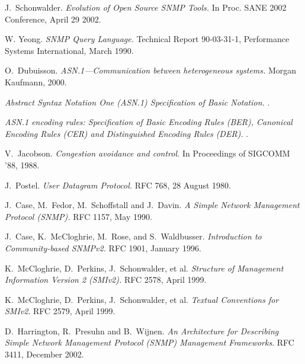 \documentclass[reprint,9pt]{sigplanconf}
\begin{document}
\begin{thebibliography}{10}

J.~Schonwalder.
\newblock \textsl{Evolution of Open Source SNMP Tools.}
\newblock In Proc. SANE 2002 Conference, April 29 2002.

W. Yeong.
\newblock \textsl{SNMP Query Language.}
\newblock Technical Report 90-03-31-1, Performance Systems International, March 1990.

O.~Dubuisson.
\newblock \textsl{ASN.1---Communication between heterogeneous systems.}
\newblock Morgan Kaufmann, 2000.

\textsl{Abstract Syntax Notation One (ASN.1) Specification of Basic
  Notation.}
.

\textsl{ASN.1 encoding rules: Specification of Basic Encoding Rules
  (BER), Canonical Encoding Rules (CER) and Distinguished Encoding Rules
  (DER).}
.

V.~Jacobson.
\newblock \textsl{Congestion avoidance and control.}
\newblock In Proceedings of SIGCOMM '88, 1988.


J.~Postel.
\newblock \textsl{User Datagram Protocol.}
\newblock RFC 768, 28 August 1980.

J.~Case, M.~Fedor, M.~Schoffstall and J.~Davin.
\newblock \textsl{A Simple Network Management Protocol (SNMP).}
\newblock RFC 1157, May 1990.

J.~Case, K.~McCloghrie, M.~Rose, and S.~Waldbusser.
\newblock \textsl{Introduction to Community-based SNMPv2.}
\newblock RFC 1901, January 1996.

K.~McCloghrie, D.~Perkins, J.~Schonwalder, et al.
\newblock \textsl{Structure of Management Information Version 2 (SMIv2).}
\newblock RFC 2578, April 1999.

K.~McCloghrie, D.~Perkins, J.~Schonwalder, et al.
\newblock \textsl{Textual Conventions for SMIv2}.
\newblock RFC 2579, April 1999.

D.~Harrington, R.~Presuhn and B.~Wijnen.
\newblock \textsl{An Architecture for Describing
	Simple Network Management Protocol (SNMP) Management Frameworks}.
\newblock RFC 3411, December 2002.


\end{thebibliography}
\end{document}
